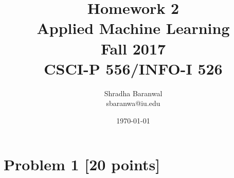 \documentclass{article}
\begin{document}
\title{Homework 2\\ Applied Machine Learning \\ Fall 2017\\ CSCI-P 556/INFO-I 526}         %
  \author{ Shradha Baranwal \\ sbaranwa@iu.edu}       %
\date{\today}          %
\maketitle
\makeatother     %
\pagestyle{plain}




 
 
\section*{Problem 1 [20 points]} 
\end{document}
